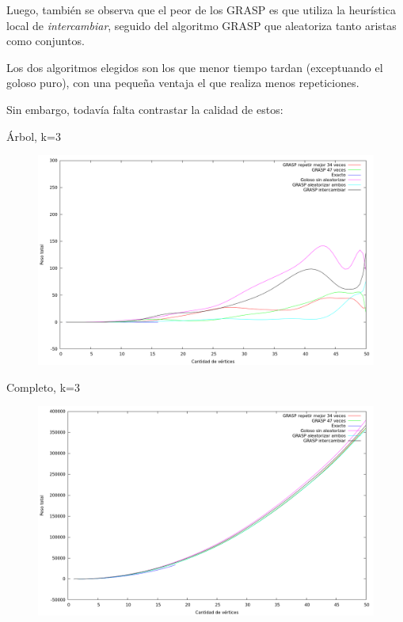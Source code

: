 Luego, también se observa que el peor de los GRASP es que utiliza la heurística
local de \textit{intercambiar}, seguido del algoritmo GRASP que aleatoriza
tanto aristas como conjuntos.

Los dos algoritmos elegidos son los que menor tiempo tardan (exceptuando el
goloso puro), con una pequeña ventaja el que realiza menos repeticiones.

Sin embargo, todavía falta contrastar la calidad de estos:

Árbol, k=3

\begin{figure}[H]
  \begin{center}
    \includegraphics[scale=0.35]{imagenes/ej6-arbol-k3-peso.png}
  \end{center}
\end{figure}

Completo, k=3

\begin{figure}[H]
  \begin{center}
    \includegraphics[scale=0.35]{imagenes/ej6-completo-k3-peso.png}
  \end{center}
\end{figure}

